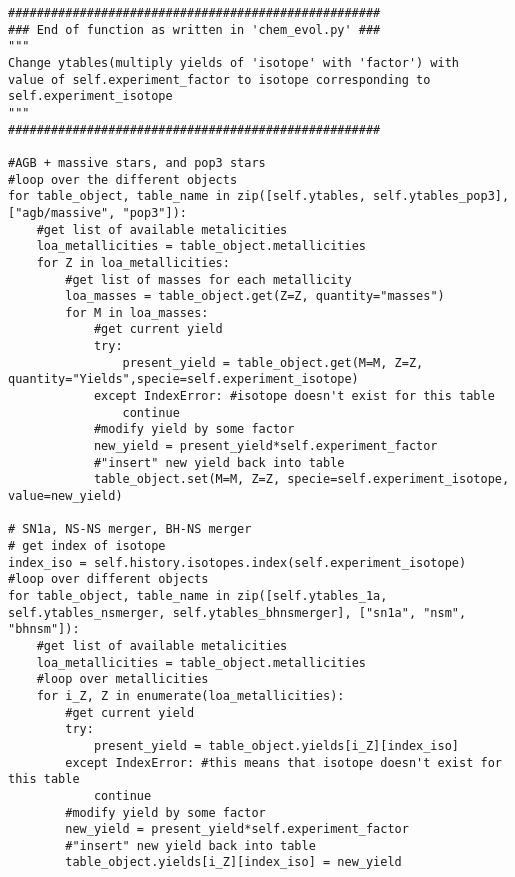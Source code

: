 \begin{lstlisting}[style=custompython, caption={\label{lst:mod-omega}Snippet of code added to the existing function \texttt{\_\_set\_yield\_tables} in \chemevol\ in \omegamodel-framework. The code-snippet multiplies the yield of isotope \texttt{self.experiment\_isotope} with a factor \texttt{self.experiment\_factor} for all yield-tables where the isotope can be found.}]
####################################################
### End of function as written in 'chem_evol.py' ###
""" 
Change ytables(multiply yields of 'isotope' with 'factor') with
value of self.experiment_factor to isotope corresponding to self.experiment_isotope
"""
####################################################

#AGB + massive stars, and pop3 stars
#loop over the different objects
for table_object, table_name in zip([self.ytables, self.ytables_pop3], ["agb/massive", "pop3"]):
    #get list of available metalicities
    loa_metallicities = table_object.metallicities
    for Z in loa_metallicities:
        #get list of masses for each metallicity
        loa_masses = table_object.get(Z=Z, quantity="masses")
        for M in loa_masses:
            #get current yield
            try:
                present_yield = table_object.get(M=M, Z=Z, quantity="Yields",specie=self.experiment_isotope)
            except IndexError: #isotope doesn't exist for this table
                continue
            #modify yield by some factor
            new_yield = present_yield*self.experiment_factor
            #"insert" new yield back into table
            table_object.set(M=M, Z=Z, specie=self.experiment_isotope, value=new_yield)

# SN1a, NS-NS merger, BH-NS merger
# get index of isotope
index_iso = self.history.isotopes.index(self.experiment_isotope)
#loop over different objects
for table_object, table_name in zip([self.ytables_1a, self.ytables_nsmerger, self.ytables_bhnsmerger], ["sn1a", "nsm", "bhnsm"]):
    #get list of available metalicities
    loa_metallicities = table_object.metallicities
    #loop over metallicities
    for i_Z, Z in enumerate(loa_metallicities):
        #get current yield
        try:
            present_yield = table_object.yields[i_Z][index_iso]
        except IndexError: #this means that isotope doesn't exist for this table
            continue
        #modify yield by some factor
        new_yield = present_yield*self.experiment_factor
        #"insert" new yield back into table
        table_object.yields[i_Z][index_iso] = new_yield
\end{lstlisting}
